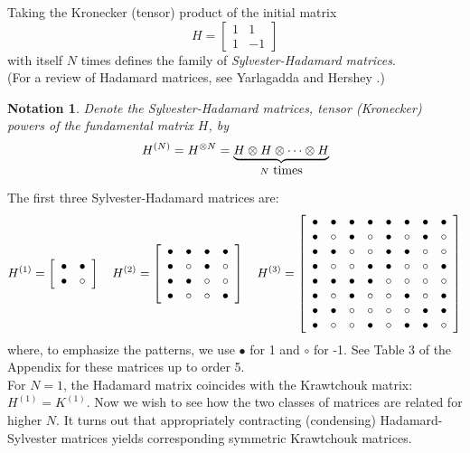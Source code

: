 \documentclass[12pt]{article}
\newtheorem{notation}[theorem]{Notation}
\numberwithin{equation}{section}
\begin{document}
Taking the Kronecker (tensor) product of the initial matrix
\begin{equation*}
  H=\left[\begin{array}{cr} 
         1& 1\\
         1& -1 \end{array}\right]
\end{equation*}
%
with itself $N$ times defines the family of {\sl Sylvester-Hadamard matrices}.\\
  
(For a review of Hadamard matrices, see Yarlagadda and Hershey \cite{YH}.) %
\bigskip


\begin{notation}
Denote the Sylvester-Hadamard matrices, tensor (Kronecker) powers
of the fundamental matrix $H$, by
%
\begin{displaymath}
  H^{(N)} = H^{\otimes N} =
      \underbrace{H\otimes H\otimes \cdots \otimes H}_{N\hbox{ times}} 
\end{displaymath}
\end{notation}
%
The first three Sylvester-Hadamard matrices are: 
\def\b{\circ}   \def\a{\bullet}
$$
H^{(1)}=\left[
\begin{array}{cc}
\a &\a  \cr
\a &\b  \cr
\end{array}\right]
%
\quad
%
H^{(2)}=\left[\begin{array}{cccc}
\a &\a &\a &\a  \cr
\a &\b &\a &\b   \cr 
\a &\a &\b &\b   \cr
\a &\b &\b &\a   \cr
\end{array}\right]
%
\quad
%
H^{(3)}=\left[\begin{array}{cccccccc}
\a &\a &\a &\a  &\a &\a &\a &\a    \cr
\a &\b &\a &\b  &\a &\b &\a &\b    \cr
\a &\a &\b &\b  &\a &\a &\b &\b    \cr
\a &\b &\b &\a  &\a &\b &\b &\a    \cr
%
\a &\a &\a &\a  &\b &\b &\b &\b    \cr 
\a &\b &\a &\b  &\b &\a &\b &\a    \cr 
\a &\a &\b &\b  &\b &\b &\a &\a    \cr 
\a &\b &\b &\a  &\b &\a &\a &\b    \cr 
\end{array}\right] 
$$ 
where, to emphasize the patterns, we use
$\bullet$ for 1 and $\circ$ for -1. See Table 3 of the Appendix for these matrices up to order 5.
\\

For $N=1$, the Hadamard matrix coincides with 
the Krawtchouk matrix:  $H^{(1)}=K^{(1)}$.
Now we wish to see how the two classes of matrices are related for higher $N$.
It turns out that appropriately contracting (condensing) Hadamard-Sylvester matrices 
yields corresponding symmetric Krawtchouk  matrices.\bigskip
\end{document}
